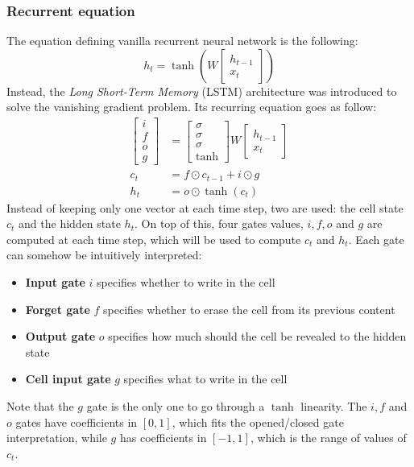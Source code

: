 \subsubsection{Recurrent equation}
The equation defining vanilla recurrent neural network is the following:
\begin{equation}
    h_t = \tanh\left(W\begin{bmatrix}
            h_{t-1}\\
            x_t
        \end{bmatrix}\right)
\end{equation}
Instead, the \emph{Long Short-Term Memory} (LSTM) architecture was introduced to solve the vanishing gradient problem. Its recurring equation goes as follow:
\begin{equation*}
    \tag{LSTM}
    \begin{aligned}
        \begin{bmatrix}
            i\\
            f\\
            o\\
            g
        \end{bmatrix}
        &= \begin{bmatrix}
            \sigma\\
            \sigma\\
            \sigma\\
            \tanh
        \end{bmatrix} W \begin{bmatrix}
            h_{t-1}\\
            x_t
        \end{bmatrix} \\
        c_t &= f \odot c_{t-1} + i\odot g\\
        h_t &= o \odot \tanh(c_t)
    \end{aligned}
\end{equation*}
Instead of keeping only one vector at each time step, two are used: the cell state $c_t$ and the hidden state $h_t$. On top of this, four gates values, $i,f,o$ and $g$ are computed at each time step, which will be used to compute $c_t$ and $h_t$. Each gate can somehow be intuitively interpreted:
\begin{itemize}
    \item \textbf{Input gate} $i$ specifies whether to write in the cell
    \item \textbf{Forget gate} $f$ specifies whether to erase the cell from its previous content
    \item \textbf{Output gate} $o$ specifies how much should the cell be revealed to the hidden state
    \item \textbf{Cell input gate} $g$ specifies what to write in the cell
\end{itemize}
Note that the $g$ gate is the only one to go through a $\tanh$ linearity. The $i,f$ and $o$ gates have coefficients in $[0,1]$, which fits the opened/closed gate interpretation, while $g$ has coefficients in $[-1,1]$, which is the range of values of $c_t$.

